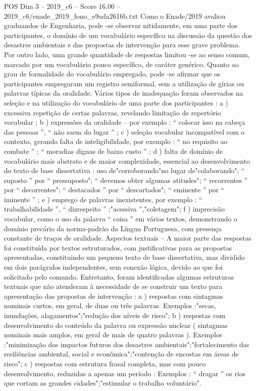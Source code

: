 \begin{textsample}{POS Dim 3 – 2019\_c6 – Score 16.00 – 2019\_c6/enade\_2019\_fono\_e9ada2616b.txt}
Como o Enade/2019 avaliou graduandos de Engenharia, pode -se observar nitidamente, em uma parte dos participantes, o domínio de um vocabulário específico na discussão da questão dos desastres ambientais e das propostas de intervenção para esse grave problema.
Por outro lado, uma grande quantidade de respostas limitou -se ao senso comum, marcado por um vocabulário pouco específico, de caráter genérico.
Quanto ao grau de formalidade do vocabulário empregado, pode -se afirmar que os participantes empregaram um registro semiformal, sem a utilização de gírias ou palavras típicas da oralidade.
Vários tipos de inadequação foram observados na seleção e na utilização do vocabulário de uma parte dos participantes : a ) excessiva repetição de certas palavras, revelando limitação de repertório vocabular ; b ) expressões da oralidade – por exemplo : “ colocar isso na cabeça das pessoas ”, “ não saem do lugar ” ; c ) seleção vocabular incompatível com o contexto, gerando falta de inteligibilidade, por exemplo : “ no requisito ao combate ” ; “ moradias dignas de baixo custo ” ; d ) falta de domínio de vocabulário mais abstrato e de maior complexidade, essencial ao desenvolvimento do texto de base dissertativa : uso de"corroborando"no lugar de"colaborando"; “ suposto ” por “ pressuposto"; “ devemos obter algumas atitudes"; “ recorrentes ” por “ decorrentes"; “ destacados ” por “ descartados"; “ eminente ” por “ iminente ” ; e ) emprego de palavras inexistentes, por exemplo : “ trabalhabilidade ”, “ dizrespeito ” ;"acessiva ”,"coletagem"; f ) imprecisão vocabular, como o uso da palavra “ coisa ” em vários textos, demonstrando o domínio precário da norma-padrão da Língua Portuguesa, com presença constante de traços de oralidade.
Aspectos textuais – A maior parte das respostas foi constituída por textos estruturados, com justificativas para as propostas apresentadas, constituindo um pequeno texto de base dissertativa, mas dividido em dois parágrafos independentes, sem conexão lógica, devido ao que foi solicitado pelo comando.
Entretanto, foram identificadas algumas estruturas textuais que não atenderam à necessidade de se construir um texto para apresentação das propostas de intervenção : a ) respostas com sintagmas nominais curtos, em geral, de duas ou três palavras.
Exemplos :"secas, inundações, alagamentos";"redução dos níveis de risco"; b ) respostas com desenvolvimento do conteúdo da palavra ou expressão nuclear ( sintagmas nominais mais amplos, em geral de mais de quatro palavras ).
Exemplos :"minimização dos impactos futuros dos desastres ambientais";"fortalecimento das resiliências ambiental, social e econômica";"contenção de encostas em áreas de risco"; c ) respostas com estrutura frasal completa, mas com pouco desenvolvimento, reduzidas a apenas um período : Exemplos : “ dragar ” os rios que cortam as grandes cidades";"estimular o trabalho voluntário".

\end{textsample}

